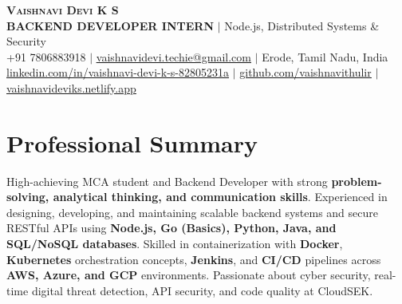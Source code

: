 \documentclass[letterpaper,10pt]{article}
\begin{document}
\begin{center}
    \textbf{\Huge \scshape Vaishnavi Devi K S} \\ \vspace{2pt}
    \textbf{\large BACKEND DEVELOPER INTERN} $|$ \small Node.js, Distributed Systems \& Security \\ \vspace{2pt}
    \small +91 7806883918 $|$ \href{mailto:vaishnavidevi.techie@gmail.com}{\underline{vaishnavidevi.techie@gmail.com}} $|$ Erode, Tamil Nadu, India \\ \vspace{1pt}
    \href{https://linkedin.com/in/vaishnavi-devi-k-s-82805231a}{\underline{linkedin.com/in/vaishnavi-devi-k-s-82805231a}} $|$ 
    \href{https://github.com/vaishnavithulir}{\underline{github.com/vaishnavithulir}} $|$ 
    \href{https://vaishnavideviks.netlify.app/}{\underline{vaishnavideviks.netlify.app}}
\end{center}
\vspace{-10pt}

\section{Professional Summary}
\small{High-achieving MCA student and Backend Developer with strong \textbf{problem-solving, analytical thinking, and communication skills}. Experienced in designing, developing, and maintaining scalable backend systems and secure RESTful APIs using \textbf{Node.js, Go (Basics), Python, Java, and SQL/NoSQL databases}. Skilled in containerization with \textbf{Docker}, \textbf{Kubernetes} orchestration concepts, \textbf{Jenkins}, and \textbf{CI/CD} pipelines across \textbf{AWS, Azure, and GCP} environments. Passionate about cyber security, real-time digital threat detection, API security, and code quality at CloudSEK.}
\vspace{-3pt}

\end{document}
